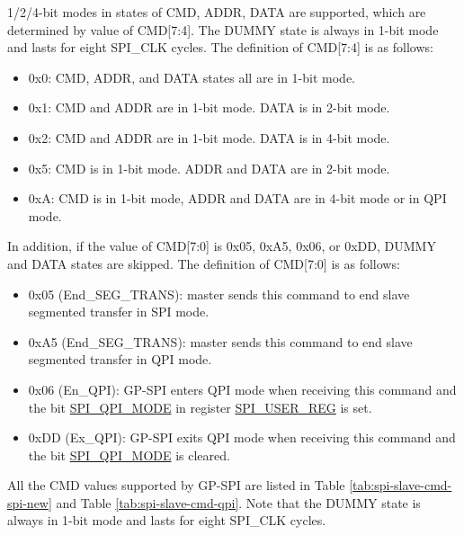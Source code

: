 \documentclass[main\_\_EN.tex]{subfiles}
\begin{document}
1/2/4-bit modes in states of CMD, ADDR, DATA are supported, which are determined by value of CMD[7:4]. The DUMMY state is always in 1-bit mode and lasts for eight SPI\_CLK cycles. The definition of CMD[7:4] is as follows:

\begin{itemize}
    \item 0x0: CMD, ADDR, and DATA states all are in 1-bit mode.
    \item 0x1: CMD and ADDR are in 1-bit mode. DATA is in 2-bit mode.
    \item 0x2: CMD and ADDR are in 1-bit mode. DATA is in 4-bit mode.
    \item 0x5: CMD is in 1-bit mode. ADDR and DATA are in 2-bit mode.
    \item 0xA: CMD is in 1-bit mode, ADDR and DATA are in 4-bit mode or in QPI mode.
\end{itemize}

In addition, if the value of CMD[7:0] is 0x05, 0xA5, 0x06, or 0xDD, DUMMY and DATA states are skipped. The definition of CMD[7:0] is as follows:

\begin{itemize}
    \item \label{cmd:ENDSEGTRANS}0x05 (End\_SEG\_TRANS): master sends this command to end slave segmented transfer in SPI mode.
    \item 0xA5 (End\_SEG\_TRANS): master sends this command to end slave segmented transfer in QPI mode.
    \item 0x06 (En\_QPI): GP-SPI enters QPI mode when receiving this command and the bit \hyperref[fielddesc:SPIQPIMODE]{SPI\_QPI\_MODE} in register \hyperref[regdesc:SPIUSERREG]{SPI\_USER\_REG} is set.
    \item 0xDD (Ex\_QPI): GP-SPI exits QPI mode when receiving this command and the bit \hyperref[fielddesc:SPIQPIMODE]{SPI\_QPI\_MODE} is cleared.
\end{itemize}


All the CMD values supported by GP-SPI are listed in Table \ref{tab:spi-slave-cmd-spi-new} and Table \ref{tab:spi-slave-cmd-qpi}. Note that the DUMMY state is always in 1-bit mode and lasts for eight SPI\_CLK cycles.
\end{document}
